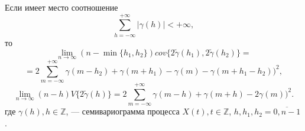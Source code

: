 \begin{Theorem}
	Если имеет место соотношение
	\begin{equation}
	\label{eq:var_abs}
		\sum_{h = -\infty}^{+\infty} \vert \gamma(h) \vert < +\infty,
	\end{equation}
	то
	\begin{equation*}
		\lim_{n \to \infty} (n - \min\{ h_1, h_2 \}) cov\{ 2 \tilde{\gamma}(h_1), 2 \tilde{\gamma}(h_2) \} = %
	\end{equation*}
	\begin{equation}
	\label{eq:asymptotic_cov}
		= 2 \sum_{m = -\infty}^{+\infty} \gamma(m - h_2) + \gamma(m + h_1) - \gamma(m) - \gamma(m + h_1 - h_2))^2,
	\end{equation}
	\begin{equation}
	\label{eq:asymptotic_var}
		\lim_{n \to \infty} (n - h) V\{ 2 \tilde{\gamma}(h) \} = 2 \sum_{m = -\infty}^{+\infty} \gamma(m - h) + \gamma(m + h) - 2 \gamma(m))^2.
	\end{equation}
	где $ \gamma(h), h \in \mathbb{Z} $, --- семивариограмма процесса $ X(t), t \in \mathbb{Z}$, $ h, h_1, h_2 = \overline{0, n - 1} $.
\end{Theorem}
